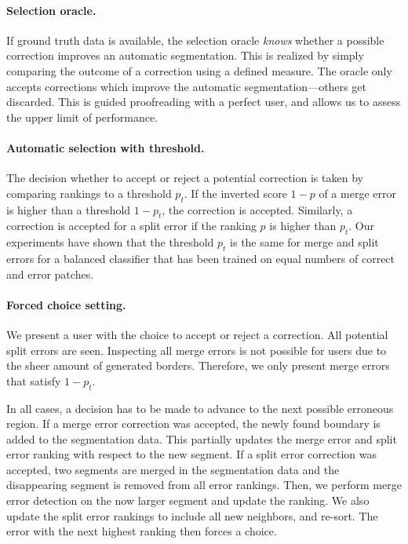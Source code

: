\paragraph{Selection oracle.} If ground truth data is available, the selection oracle \textit{knows} whether a possible correction improves an automatic segmentation. This is realized by simply comparing the outcome of a correction using a defined measure. The oracle only accepts corrections which improve the automatic segmentation---others get
discarded. This is guided proofreading with a perfect user, and allows us to assess the upper limit of performance.

\paragraph{Automatic selection with threshold.} The decision whether to accept or reject a potential correction is taken by comparing rankings to a threshold $p_t$. If the inverted score $1-p$ of a merge error is higher than a threshold $1-p_t$, the correction is accepted. Similarly, a correction is accepted for a split error if the ranking $p$ is higher than $p_t$. Our experiments have shown that the threshold $p_t$ is the same for merge and split errors for a balanced classifier that has been trained on equal numbers of correct and error patches.

\paragraph{Forced choice setting.} We present a user with the choice to accept or reject a correction. All potential split errors are seen. Inspecting all merge errors is not possible for users due to the sheer amount of generated borders. Therefore, we only present merge errors that satisfy $1-p_t$.

\noindent \newline In all cases, a decision has to be made to advance to the next possible erroneous region. If a merge error correction was accepted, the newly found boundary is added to the segmentation data. This partially updates the merge error and split error ranking with respect to the new segment. If a split error correction was accepted, two segments are merged in the segmentation data and the disappearing segment is removed from all error rankings. Then, we perform merge error detection on the now larger segment and update the ranking. We also update the split error rankings to include all new neighbors, and re-sort. The error with the next highest ranking then forces a choice.

